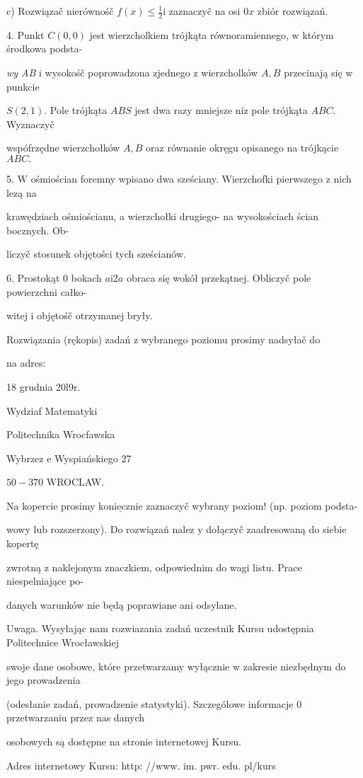 \documentclass[a4paper,12pt]{article}
\begin{document}
c) Rozwiązač nierównośč $f(x)\displaystyle \leq\frac{1}{2}\mathrm{i}$ zaznaczyč na osi $0x$ zbiór rozwiązań.

4. Punkt $C(0,0)$ jest wierzcholkiem trójkąta równoramiennego, $\mathrm{w}$ którym środkowa podsta-

{\it wy AB} $\mathrm{i}$ wysokośč poprowadzona zjednego $\mathrm{z}$ wierzcholków $A, B$ przecinają się $\mathrm{w}$ punkcie

$S(2,1)$. Pole trójkąta $ABS$ jest dwa razy mniejsze $\mathrm{n}\mathrm{i}\dot{\mathrm{z}}$ pole trójkąta $ABC$. Wyznaczyč

wspófrzędne wierzchołków $A, B$ oraz równanie okręgu opisanego na trójkącie $ABC.$

5. $\mathrm{W}$ ośmiościan foremny wpisano dwa sześciany. Wierzchofki pierwszego $\mathrm{z}$ nich lezą na

krawędziach ośmiościanu, a wierzchołki drugiego- na wysokościach ścian bocznych. Ob-

liczyč stosunek objętości tych sześcianów.

6. Prostokąt $0$ bokach $a\mathrm{i}2a$ obraca się wokół przekątnej. Obliczyč pole powierzchni całko-

witej $\mathrm{i}$ objętośč otrzymanej bryły.

Rozwiązania (rękopis) zadań z wybranego poziomu prosimy nadsyłač do

na adres:

18 grudnia 20l9r.

Wydziaf Matematyki

Politechnika Wrocfawska

Wybrzez $\mathrm{e}$ Wyspiańskiego 27

$50-370$ WROCLAW.

Na kopercie prosimy $\underline{\mathrm{k}\mathrm{o}\mathrm{n}\mathrm{i}\mathrm{e}\mathrm{c}\mathrm{z}\mathrm{n}\mathrm{i}\mathrm{e}}$ zaznaczyč wybrany poziom! (np. poziom podsta-

wowy lub rozszerzony). Do rozwiązań nalez $\mathrm{y}$ dołączyč zaadresowaną do siebie kopertę

zwrotną $\mathrm{z}$ naklejonym znaczkiem, odpowiednim do wagi listu. Prace niespelniające po-

danych warunków nie będą poprawiane ani odsylane.

Uwaga. Wysyłając nam rozwiazania zadań uczestnik Kursu udostępnia Politechnice Wrocławskiej

swoje dane osobowe, które przetwarzamy wyłącznie $\mathrm{w}$ zakresie niezbędnym do jego prowadzenia

(odesłanie zadań, prowadzenie statystyki). Szczególowe informacje $0$ przetwarzaniu przez nas danych

osobowych są dostępne na stronie internetowej Kursu.

Adres internetowy Kursu: http: //www. im. pwr. edu. pl/kurs
\end{document}
